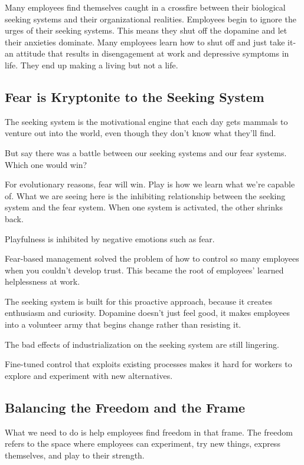 \documentclass[ebook,12pt,oneside,openany]{memoir}
\begin{document}
Many employees find themselves caught in a crossfire between their biological seeking systems and their organizational realities.
Employees begin to ignore the urges of their seeking systems. This means they shut off the dopamine and let their anxieties dominate.
Many employees learn how to shut off and just take it-an attitude that results in disengagement at work and depressive symptoms in life.
They end up making a living but not a life.

\subsection{Fear is Kryptonite to the Seeking System}
The seeking system is the motivational engine that each day gets mammals to venture out into the world,
even though they don't know what they'll find. 

But say there was a battle between our seeking systems and our fear systems.
Which one would win?

For evolutionary reasons, fear will win. Play is how we learn what we're capable of.
What we are seeing here is the inhibiting relationship between the seeking system and the fear system.
When one system is activated, the other shrinks back.

Playfulness is inhibited by negative emotions such as fear.

Fear-based management solved the problem of how to control so many employees when you couldn't develop trust.
This became the root of employees' learned helplessness at work.

The seeking system is built for this proactive approach, because it creates enthusiasm and curiosity.
Dopamine doesn't just feel good, it makes employees into a volunteer army that begins change rather than resisting it.

The bad effects of industrialization on the seeking system are still lingering.

Fine-tuned control that exploits existing processes makes it hard for workers to explore and experiment with new alternatives.

\subsection{Balancing the Freedom and the Frame}
What we need to do is help employees find freedom in that frame.
The freedom refers to the space where employees can experiment, try new things,
express themselves, and play to their strength.
\end{document}
